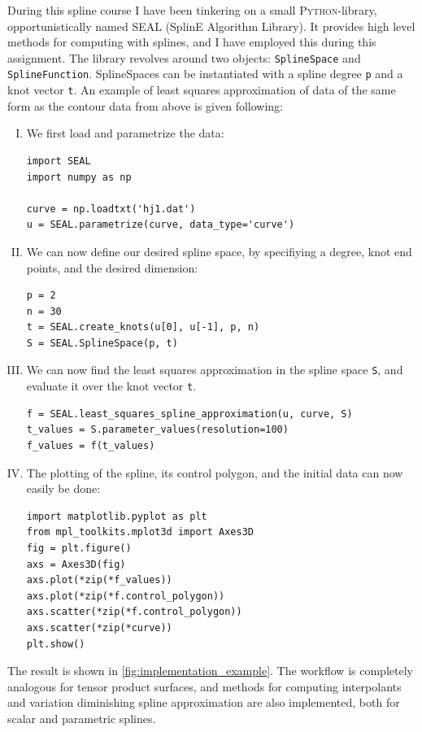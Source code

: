 \documentclass[article]{memoir}
\begin{document}
During this spline course I have been tinkering on a small
\textsc{Python}-library, opportunistically named \textsc{SEAL} (SplinE
Algorithm Library). It provides high level methods for computing with splines,
and I have employed this during this assignment. The library revolves around
two objects: \texttt{SplineSpace} and \texttt{SplineFunction}. SplineSpaces can
be instantiated with a spline degree \texttt{p} and a knot vector \texttt{t}.
An example of least squares approximation of data of the same form as the
contour data from above is given following:

\begin{enumerate}[I)]
    \item We first load and parametrize the data:
\begin{verbatim}
import SEAL
import numpy as np

curve = np.loadtxt('hj1.dat')
u = SEAL.parametrize(curve, data_type='curve') 
\end{verbatim}
\item We can now define our desired spline space, by specifiying a degree, knot end
points, and the desired dimension:
\begin{verbatim}
p = 2
n = 30
t = SEAL.create_knots(u[0], u[-1], p, n)
S = SEAL.SplineSpace(p, t)
\end{verbatim}
\item We can now find the least squares approximation in the spline space \texttt{S},
and evaluate it over the knot vector \texttt{t}.
\begin{verbatim}
f = SEAL.least_squares_spline_approximation(u, curve, S)
t_values = S.parameter_values(resolution=100)
f_values = f(t_values)
\end{verbatim}
\item The plotting of the spline, its control polygon, and the initial data can now
easily be done:
\begin{verbatim}
import matplotlib.pyplot as plt
from mpl_toolkits.mplot3d import Axes3D
fig = plt.figure()
axs = Axes3D(fig)
axs.plot(*zip(*f_values))
axs.plot(*zip(*f.control_polygon))
axs.scatter(*zip(*f.control_polygon))
axs.scatter(*zip(*curve))
plt.show()
\end{verbatim}
\end{enumerate}
The result is shown in \cref{fig:implementation_example}.  The workflow is
completely analogous for tensor product surfaces, and methods for computing
interpolants and variation diminishing spline approximation are also
implemented, both for scalar and parametric splines.
\end{document}
